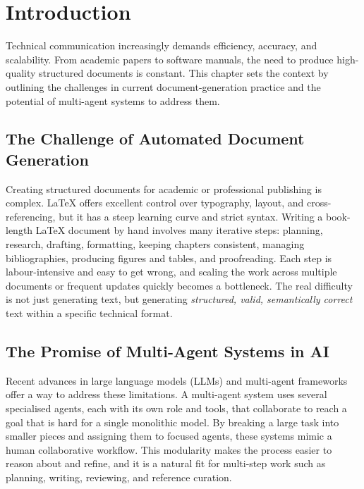 
\chapter{Introduction}

Technical communication increasingly demands efficiency, accuracy, and
scalability. From academic papers to software manuals, the need to produce
high-quality structured documents is constant. This chapter sets the context
by outlining the challenges in current document-generation practice and the
potential of multi-agent systems to address them.

\section{The Challenge of Automated Document Generation}

Creating structured documents for academic or professional publishing is
complex. \LaTeX{} offers excellent control over typography, layout, and
cross-referencing, but it has a steep learning curve and strict syntax.
Writing a book-length \LaTeX{} document by hand involves many iterative
steps: planning, research, drafting, formatting, keeping chapters consistent,
managing bibliographies, producing figures and tables, and proofreading. Each
step is labour-intensive and easy to get wrong, and scaling the work across
multiple documents or frequent updates quickly becomes a bottleneck. The real
difficulty is not just generating text, but generating \emph{structured,
valid, semantically correct} text within a specific technical format.

\section{The Promise of Multi-Agent Systems in AI}

Recent advances in large language models (LLMs) and multi-agent frameworks
offer a way to address these limitations. A multi-agent system uses several
specialised agents, each with its own role and tools, that collaborate to
reach a goal that is hard for a single monolithic model. By breaking a large
task into smaller pieces and assigning them to focused agents, these systems
mimic a human collaborative workflow. This modularity makes the process
easier to reason about and refine, and it is a natural fit for multi-step
work such as planning, writing, reviewing, and reference curation.

